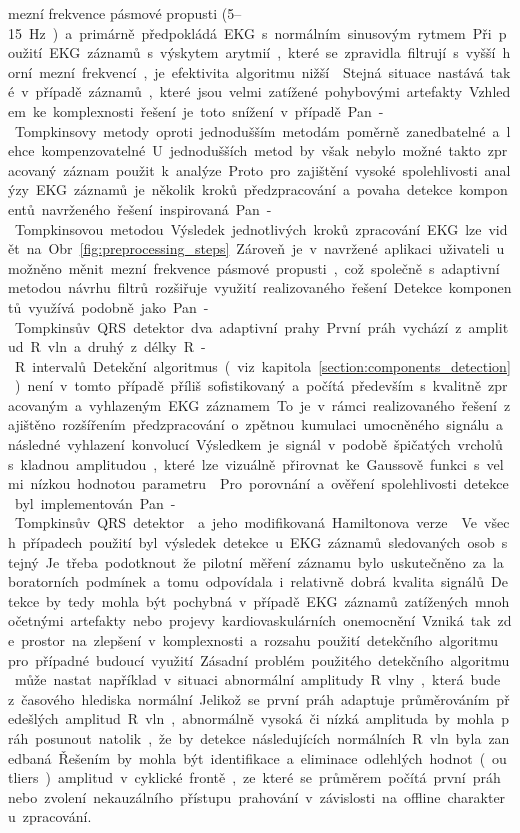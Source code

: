 mezní frekvence pásmové propusti (5--15~\si\Hz) a primárně předpokládá EKG s
normálním sinusovým rytmem. Při použití EKG záznamů s výskytem arytmií, které se
zpravidla filtrují s vyšší horní mezní frekvencí, je efektivita algoritmu
nižší~\cite{Fariha2020}. Stejná situace nastává také v případě záznamů, které
jsou velmi zatížené pohybovými artefakty. Vzhledem ke komplexnosti řešení je
toto snížení v případě Pan-Tompkinsovy metody oproti jednodušším metodám poměrně
zanedbatelné a lehce kompenzovatelné. U jednodušších metod by však nebylo možné
takto zpracovaný záznam použit k analýze. Proto pro zajištění vysoké
spolehlivosti analýzy EKG záznamů je několik kroků předzpracování a povaha
detekce komponentů navrženého řešení inspirovaná Pan-Tompkinsovou metodou.
Výsledek jednotlivých kroků zpracování EKG lze vidět na
Obr.~\ref{fig:preprocessing_steps}. Zároveň je v navržené aplikaci uživateli
umožněno měnit mezní frekvence pásmové propusti, což společně s adaptivní
metodou návrhu filtrů rozšiřuje využití realizovaného řešení. 

Detekce komponentů využívá podobně jako Pan-Tompkinsův QRS detektor dva
adaptivní prahy. První práh vychází z amplitud R vln a druhý z délky R-R
intervalů. Detekční algoritmus (viz kapitola~\ref{section:components_detection})
není v tomto případě příliš sofistikovaný a počítá především s kvalitně
zpracovaným a vyhlazeným EKG záznamem. To je v rámci realizovaného řešení
zajištěno rozšířením předzpracování o zpětnou kumulaci umocněného signálu a
následné vyhlazení konvolucí. Výsledkem je signál v podobě špičatých vrcholů s
kladnou amplitudou, které lze vizuálně přirovnat ke Gaussově funkci s velmi
nízkou hodnotou parametru~\textsigma. Pro porovnání a ověření spolehlivosti
detekce byl implementován Pan-Tompkinsův QRS detektor~\cite{Pan1985} a jeho
modifikovaná Hamiltonova verze~\cite{Hamilton1987}. Ve všech případech použití
byl výsledek detekce u EKG záznamů sledovaných osob stejný. Je třeba podotknout
že pilotní měření záznamu bylo uskutečněno za laboratorních podmínek a tomu
odpovídala i relativně dobrá kvalita signálů. Detekce by tedy mohla být pochybná
v případě EKG záznamů zatížených mnohočetnými artefakty nebo projevy
kardiovaskulárních onemocnění. Vzniká tak zde prostor na zlepšení v komplexnosti
a rozsahu použití detekčního algoritmu pro případné budoucí využití. Zásadní
problém použitého detekčního algoritmu může nastat například v situaci
abnormální amplitudy R vlny, která bude z časového hlediska normální. Jelikož se
první práh adaptuje průměrováním předešlých amplitud R vln, abnormálně vysoká či
nízká amplituda by mohla práh posunout natolik, že by detekce následujících
normálních R vln byla zanedbaná. Řešením by mohla být identifikace a eliminace
odlehlých hodnot (outliers) amplitud v cyklické frontě, ze které se průměrem
počítá první práh nebo zvolení nekauzálního přístupu prahování v závislosti na
offline charakteru zpracování. 

